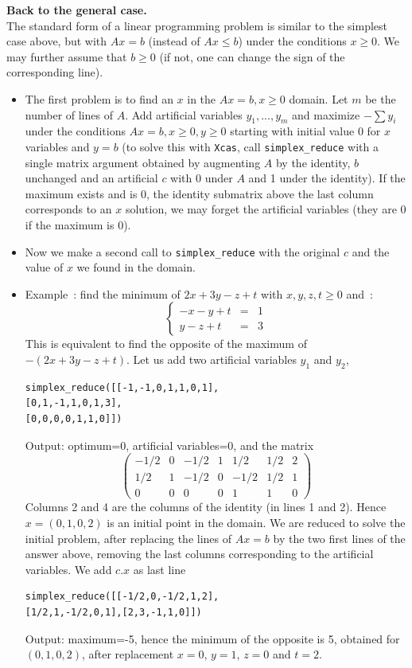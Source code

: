\documentclass[a4paper,11pt]{book}
\begin{document}
{\bf Back to the general case.}\\
The standard form of a linear programming problem is similar
to the simplest case above, but with $Ax=b$ (instead of $Ax\leq b$)
under the conditions $x\geq 0$. We may further assume that $b\geq 0$
(if not, one can change the sign of the corresponding line).
\begin{itemize}
\item The first problem is to find an $x$ in the $Ax=b, x\geq 0$ domain.
Let $m$ be the number of lines of $A$. Add artificial variables
$y_1,...,y_m$ and maximize
$-\sum y_i$ under the conditions $Ax=b, x \geq 0, y \geq 0$
starting with initial value $0$ for $x$ variables
and $y=b$
(to solve this with {\tt Xcas}, call \verb|simplex_reduce| with
a single matrix argument obtained by augmenting $A$ by the
identity, $b$ unchanged and an artificial
$c$ with 0 under $A$ and 1 under the identity).
If the maximum exists and is 0, the identity submatrix above the last
column corresponds to an $x$ solution, we may forget the artificial
variables (they are 0 if the maximum is 0).
\item Now we make a second call to \verb|simplex_reduce|
with the original $c$ and the value of $x$ we found in the domain.
\item
Example~: find the minimum of $2x+3y-z+t$ with
$x,y,z,t\geq 0$ and~:
\[ \left\{ \begin{array}{rcl}
-x-y+t&=&1\\
y-z+t&=&3
\end{array}
\right. \]
This is equivalent to find the opposite of the maximum of $-(2x+3y-z+t)$.
Let us add two artificial variables $y_1$ and $y_2$,
\begin{verbatim}
simplex_reduce([[-1,-1,0,1,1,0,1],
[0,1,-1,1,0,1,3],
[0,0,0,0,1,1,0]])
\end{verbatim}
Output: optimum=0, artificial variables=0, and the matrix
\[
\left(\begin{array}{ccccccc}
-1/2 & 0 & -1/2 & 1 & 1/2 & 1/2 & 2 \\
1/2 & 1 & -1/2 & 0 & -1/2 & 1/2 & 1 \\
0 & 0 & 0 & 0 & 1 & 1 & 0
\end{array}\right)
\]
Columns 2 and 4 are the columns of the identity (in lines 1 and 2).
Hence $x=(0,1,0,2)$ is an initial point in the domain.
We are reduced to solve the initial problem, after replacing the
lines of $Ax=b$ by the two first lines of the answer above,
removing the last columns corresponding to the artificial variables.
We add $c.x$ as last line
\begin{verbatim}
simplex_reduce([[-1/2,0,-1/2,1,2],
[1/2,1,-1/2,0,1],[2,3,-1,1,0]])
\end{verbatim}
Output: maximum=-5, hence the minimum of the opposite is 5,
obtained for $(0,1,0,2)$, after replacement
$x=0$, $y=1$, $z=0$ and $t=2$.
\end{itemize}
\end{document}
